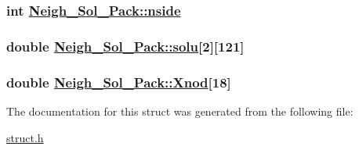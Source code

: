 \hypertarget{structNeigh__Sol__Pack_o0}{
\subsubsection[nside]{\setlength{\rightskip}{0pt plus 5cm}int \hyperlink{structNeigh__Sol__Pack_o0}{Neigh\_\-Sol\_\-Pack::nside}}}
\label{structNeigh__Sol__Pack_o0}


\hypertarget{structNeigh__Sol__Pack_o3}{
\subsubsection[solu]{\setlength{\rightskip}{0pt plus 5cm}double \hyperlink{structNeigh__Sol__Pack_o3}{Neigh\_\-Sol\_\-Pack::solu}\mbox{[}2\mbox{]}\mbox{[}121\mbox{]}}}
\label{structNeigh__Sol__Pack_o3}


\hypertarget{structNeigh__Sol__Pack_o4}{
\subsubsection[Xnod]{\setlength{\rightskip}{0pt plus 5cm}double \hyperlink{structNeigh__Sol__Pack_o4}{Neigh\_\-Sol\_\-Pack::Xnod}\mbox{[}18\mbox{]}}}
\label{structNeigh__Sol__Pack_o4}




The documentation for this struct was generated from the following file:\begin{CompactItemize}
\item 
\hyperlink{struct_8h}{struct.h}\end{CompactItemize}
